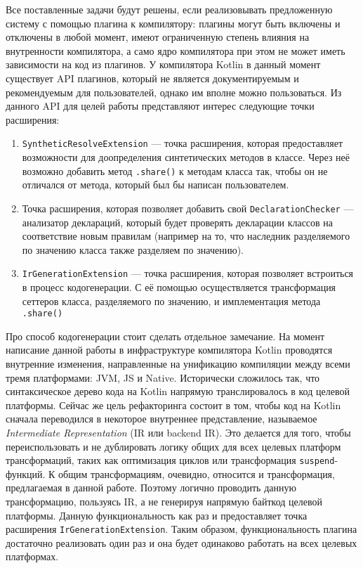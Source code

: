 \documentclass[specification,annotation,times]{itmo-student-thesis}
\begin{document}
Все поставленные задачи будут решены, если реализовывать предложенную систему с помощью плагина к компилятору: плагины могут быть включены и отключены в любой момент, имеют ограниченную степень влияния на внутренности компилятора, а само ядро компилятора при этом не может иметь зависимости на код из плагинов.
У компилятора Kotlin в данный момент существует API плагинов, который не является документируемым и рекомендуемым для пользователей, однако им вполне можно пользоваться. Из данного API для целей работы представляют интерес следующие точки расширения:

\begin{enumerate}
	\item \texttt{SyntheticResolveExtension} --- точка расширения, которая предоставляет возможности для доопределения синтетических методов в классе. Через неё возможно добавить метод \texttt{.share()} к методам класса так, чтобы он не отличался от метода, который был бы написан пользователем.
	\item Точка расширения, которая позволяет добавить свой \texttt{DeclarationChecker} --- анализатор деклараций, который будет проверять декларации классов на соответствие новым правилам (например на то, что наследник разделяемого по значению класса также разделяем по значению).
	\item \texttt{IrGenerationExtension} --- точка расширения, которая позволяет встроиться в процесс кодогенерации. С её помощью осуществляется трансформация сеттеров класса, разделяемого по значению, и имплементация метода \texttt{.share()}
\end{enumerate}

Про способ кодогенерации стоит сделать отдельное замечание. На момент написание данной работы в инфраструктуре компилятора Kotlin проводятся внутренние изменения, направленные на унификацию компиляции между всеми тремя платформами: JVM, JS и Native.
Исторически сложилось так, что синтаксическое дерево кода на Kotlin напрямую транслировалось в код целевой платформы. Сейчас же цель рефакторинга состоит в том, чтобы код на Kotlin сначала переводился в некоторое внутреннее представление, называемое \textit{Intermediate Representation} (IR или backend IR). Это делается для того, чтобы переиспользовать и не дублировать логику общих для всех целевых платформ трансформаций, таких как оптимизация циклов или трансформация \texttt{suspend}-функций.
К общим трансформациям, очевидно, относится и трансформация, предлагаемая в данной работе. Поэтому логично проводить данную трансформацию, пользуясь IR, а не генерируя напрямую байткод целевой платформы. Данную функциональность как раз и предоставляет точка расширения \texttt{IrGenerationExtension}. Таким образом, функциональность плагина достаточно реализовать один раз и она будет одинаково работать на всех целевых платформах.
\end{document}
